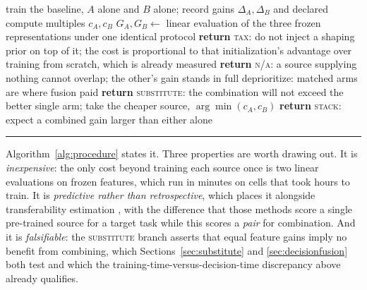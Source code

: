 \begin{table}[pos=htbp]
\begin{minipage}{\columnwidth}
\begin{algorithmic}[1]
\STATE train the baseline, $A$ alone and $B$ alone; record gains
  $\Delta_A, \Delta_B$ and declared compute multiples $c_A, c_B$
\STATE $G_A, G_B \gets$ linear evaluation of the three frozen
  representations under one identical protocol
  \STATE \textbf{return} \textsc{tax}: do not inject a shaping prior on top
    of it; the cost is proportional to that initialization's advantage over
    training from scratch, which is already measured
\ENDIF
{}
  \STATE \textbf{return} \textsc{n/a}: a source supplying nothing cannot
    overlap; the other's gain stands in full
\ENDIF
{} \label{alg:asym}
  \STATE deprioritize: matched arms are where fusion paid
\ENDIF
{}
  \STATE \textbf{return} \textsc{substitute}: the combination will not
    exceed the better single arm; take the cheaper source,
    $\arg\min(c_A, c_B)$
\ELSE
  \STATE \textbf{return} \textsc{stack}: expect a combined gain larger than
    either alone \label{alg:stack}
\ENDIF
\end{algorithmic}
\vspace*{-\topsep}\vspace*{4pt}
\rule{\linewidth}{0.8pt}
\end{minipage}
\end{table}

Algorithm~\ref{alg:procedure} states it. Three properties are worth drawing
out. It is \emph{inexpensive}: the only cost beyond training each source once is
two linear evaluations on frozen features, which run in minutes on cells
that took hours to train. It is \emph{predictive rather than
retrospective}, which places it alongside transferability estimation
\citep{nguyen2020leep}, with the difference that those methods
score a single pre-trained source for a target task while this scores a
\emph{pair} for combination. And it is \emph{falsifiable}: the
\textsc{substitute} branch asserts
that equal feature gains imply no benefit from combining, which
Sections~\ref{sec:substitute} and \ref{sec:decisionfusion} both test and
which the training-time-versus-decision-time discrepancy above already
qualifies.

